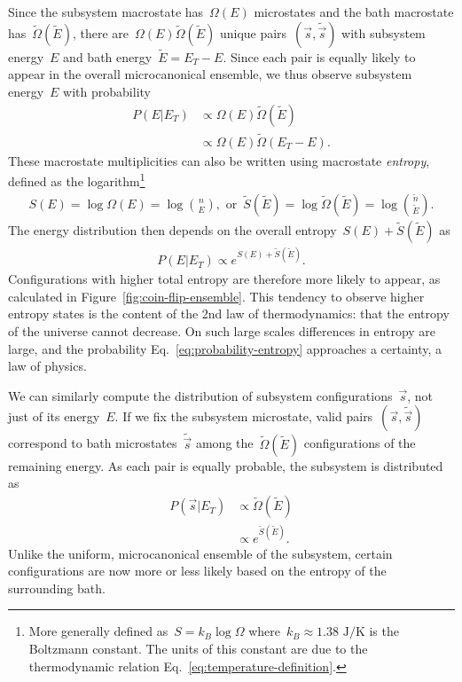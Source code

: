 Since the subsystem macrostate has~$\Omega(E)$ microstates and the bath macrostate has~$\tilde{\Omega}(\tilde{E})$, there are~$\Omega(E)\tilde{\Omega}(\tilde{E})$ unique pairs~$(\vec{s},\tilde{\vec{s}})$ with subsystem energy~$E$ and bath energy~$\tilde{E} = E_T - E$. Since each pair is equally likely to appear in the overall microcanonical ensemble, we thus observe subsystem energy~$E$ with probability \begin{align}
    P(E|E_T) &\propto \Omega(E)\tilde{\Omega}(\tilde{E}) \nonumber \\
    &\propto \Omega(E) \tilde{\Omega}(E_T - E). 
\end{align}
These macrostate multiplicities can also be written using macrostate \emph{entropy}, defined as the logarithm\footnote{More generally defined as~$S = k_B \log \Omega$ where~$k_B \approx 1.38 \text{ J}/\text{K}$ is the Boltzmann constant. The units of this constant are due to the thermodynamic relation Eq.~\eqref{eq:temperature-definition}.} \begin{align}
    S(E) = \log \Omega(E) = \log \binom{n}{E}, \text{ or }\, \tilde{S}(\tilde{E}) = \log \tilde{\Omega}(\tilde{E}) = \log \binom{\tilde{n}}{\tilde{E}}. \label{eq:entropy-microcanonical-definition}
\end{align}
The energy distribution then depends on the overall entropy~$S(E) + \tilde{S}(\tilde{E})$ as \begin{align}
    P(E|E_T) \propto e^{S(E) + \tilde{S}(\tilde{E})}. \label{eq:probability-entropy}
\end{align}
Configurations with higher total entropy are therefore more likely to appear, as calculated in Figure~\ref{fig:coin-flip-ensemble}. This tendency to observe higher entropy states is the content of the 2nd law of thermodynamics: that the entropy of the universe cannot decrease. On such large scales differences in entropy are large, and the probability Eq.~\eqref{eq:probability-entropy} approaches a certainty, a law of physics.

We can similarly compute the distribution of subsystem configurations~$\vec{s}$, not just of its energy~$E$. If we fix the subsystem microstate, valid pairs~$(\vec{s},\tilde{\vec{s}})$ correspond to bath microstates~$\tilde{\vec{s}}$ among the~$\tilde{\Omega}(\tilde{E})$ configurations of the remaining energy. As each pair is equally probable, the subsystem is distributed as \begin{align}
    P(\vec{s}|E_T) &\propto \tilde{\Omega}(\tilde{E}) \nonumber \\
    &\propto e^{\tilde{S}(\tilde{E})}. \label{eq:P-s-E_T}
\end{align}
Unlike the uniform, microcanonical ensemble of the subsystem, certain configurations are now more or less likely based on the entropy of the surrounding bath.

